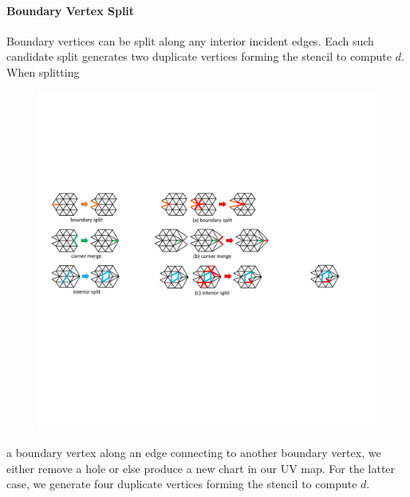 \paragraph{Boundary Vertex Split}
Boundary vertices can be split along any interior incident edges. 
Each such candidate split generates two duplicate vertices forming the stencil to compute $d$.
%
When splitting
%
\begin{figure}
  \begin{center}
  \vspace{-4mm}
    \includegraphics[width=1\linewidth]{fig/bSplit.pdf}
  \end{center}
\end{figure}
%
a boundary vertex along an edge connecting to another boundary vertex, we either remove a hole or else produce a new chart in our UV map. For the latter case, we generate four duplicate vertices forming the stencil to compute $d$.

